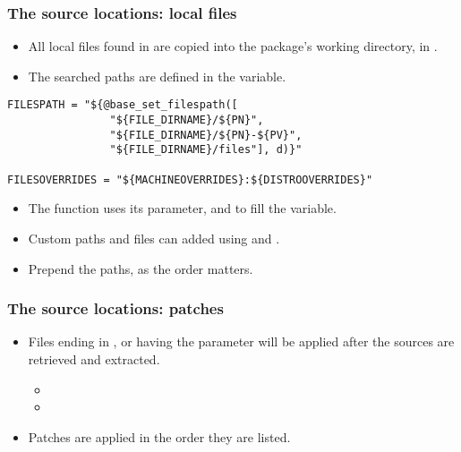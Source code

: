 \begin{frame}[fragile]
  \frametitle{The source locations: local files}
  \begin{itemize}
    \item All local files found in  are copied into the
      package's working directory, in .
    \item The searched paths are defined in the 
      variable.
  \end{itemize}
  \begin{block}{}
  \begin{verbatim}
FILESPATH = "${@base_set_filespath([
                "${FILE_DIRNAME}/${PN}",
                "${FILE_DIRNAME}/${PN}-${PV}",
                "${FILE_DIRNAME}/files"], d)}"

FILESOVERRIDES = "${MACHINEOVERRIDES}:${DISTROOVERRIDES}"
  \end{verbatim}
  \end{block}
  \begin{itemize}
    \item The  function uses its
       parameter,   and
       to fill the  variable.
    \item Custom paths and files can added using
       and .
    \item Prepend the paths, as the order matters.
  \end{itemize}
\end{frame}

\begin{frame}
  \frametitle{The source locations: patches}
  \begin{itemize}
    \item Files ending in ,  or having the
       parameter will be applied after the sources are
      retrieved and extracted.
      \begin{itemize}
        \item {}
        \item {}
      \end{itemize}
    \item Patches are applied in the order they are listed.
  \end{itemize}
\end{frame}

